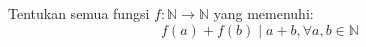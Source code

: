 Tentukan semua fungsi $f : \mathbb{N} \to \mathbb{N}$ yang memenuhi:
\[
f(a)+f(b) \mid a+b, \forall a,b \in \mathbb{N}
\]